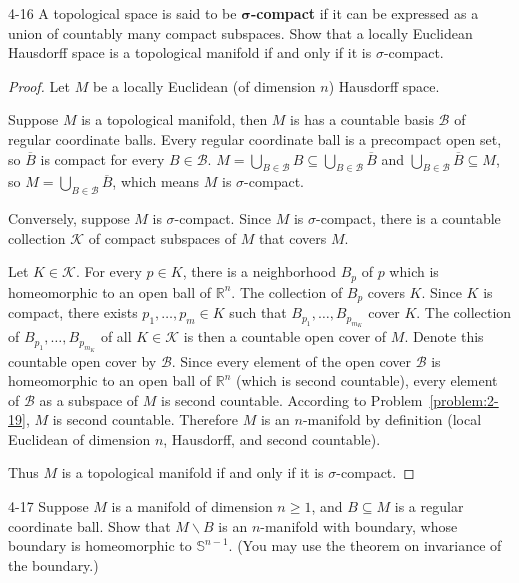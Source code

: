 \begin{problem}{4-16}\label{problem:4-16}
A topological space is said to be \textbf{$\boldsymbol{\sigma}$-compact} if it can be expressed as a union of countably many compact subspaces. Show that a locally Euclidean Hausdorff space is a topological manifold if and only if it is $\sigma$-compact.
\end{problem}

\begin{proof}
	Let $M$ be a locally Euclidean (of dimension $n$) Hausdorff space.

	Suppose $M$ is a topological manifold, then $M$ is has a countable basis $\mathscr{B}$ of regular coordinate balls. Every regular coordinate ball is a precompact open set, so $\overline{B}$ is compact for every $B\in\mathscr{B}$. $M = \bigcup_{B\in\mathscr{B}}B \subseteq \bigcup_{B\in\mathscr{B}}\overline{B}$ and $\bigcup_{B\in\mathscr{B}}\overline{B} \subseteq M$, so $M = \bigcup_{B\in\mathscr{B}}\overline{B}$, which means $M$ is $\sigma$-compact.

	Conversely, suppose $M$ is $\sigma$-compact. Since $M$ is $\sigma$-compact, there is a countable collection $\mathscr{K}$ of compact subspaces of $M$ that covers $M$.

	Let $K \in \mathscr{K}$. For every $p\in K$, there is a neighborhood $B_{p}$ of $p$ which is homeomorphic to an open ball of $\mathbb{R}^{n}$. The collection of $B_{p}$ covers $K$. Since $K$ is compact, there exists $p_{1}, \ldots, p_{m}\in K$ such that $B_{p_{1}}, \ldots, B_{p_{m_{K}}}$ cover $K$. The collection of $B_{p_{1}}, \ldots, B_{p_{m_{K}}}$ of all $K \in \mathscr{K}$ is then a countable open cover of $M$. Denote this countable open cover by $\mathscr{B}$. Since every element of the open cover $\mathscr{B}$ is homeomorphic to an open ball of $\mathbb{R}^{n}$ (which is second countable), every element of $\mathscr{B}$ as a subspace of $M$ is second countable. According to Problem~\ref{problem:2-19}, $M$ is second countable. Therefore $M$ is an $n$-manifold by definition (local Euclidean of dimension $n$, Hausdorff, and second countable).

	Thus $M$ is a topological manifold if and only if it is $\sigma$-compact.
\end{proof}

\begin{problem}{4-17}\label{problem:4-17}
Suppose $M$ is a manifold of dimension $n\geq 1$, and $B\subseteq M$ is a regular coordinate ball. Show that $M\smallsetminus B$ is an $n$-manifold with boundary, whose boundary is homeomorphic to $\mathbb{S}^{n-1}$. (You may use the theorem on invariance of the boundary.)
\end{problem}

